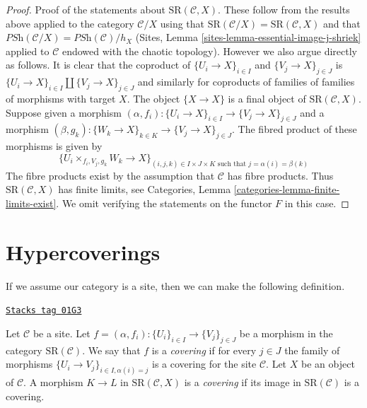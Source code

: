 \begin{proof}
\medskip\noindent
Proof of the statements about $\text{SR}(\mathcal{C}, X)$.
These follow from the results above applied to the category
$\mathcal{C}/X$ using that
$\text{SR}(\mathcal{C}/X) = \text{SR}(\mathcal{C}, X)$ and that
$\textit{PSh}(\mathcal{C}/X) = \textit{PSh}(\mathcal{C})/h_X$
(Sites, Lemma \ref{sites-lemma-essential-image-j-shriek} applied
to $\mathcal{C}$ endowed with the chaotic topology). However
we also argue directly as follows.
It is clear that the coproduct of
$\{U_i \to X\}_{i \in I}$ and $\{V_j \to X\}_{j \in J}$
is $\{U_i \to X\}_{i \in I} \amalg \{V_j \to X\}_{j \in J}$
and similarly for coproducts of
families of families of morphisms with target $X$.
The object $\{X \to X\}$ is a final
object of $\text{SR}(\mathcal{C}, X)$.
Suppose given a morphism
$(\alpha, f_i) : \{U_i \to X\}_{i \in I} \to \{V_j \to X\}_{j \in J}$
and a morphism
$(\beta, g_k) : \{W_k \to X\}_{k \in K} \to \{V_j \to X\}_{j \in J}$.
The fibred product of these morphisms is given by
$$
\{ U_i \times_{f_i, V_j, g_k} W_k \to X \}_{(i, j, k) \in I \times J \times K
\text{ such that } j = \alpha(i) = \beta(k)}
$$
The fibre products exist by the assumption that
$\mathcal{C}$ has fibre products.
Thus $\text{SR}(\mathcal{C}, X)$ has finite limits,
see Categories, Lemma \ref{categories-lemma-finite-limits-exist}.
We omit verifying the statements on the functor $F$ in this case.
\end{proof}

\section{Hypercoverings}
\label{hypercovering-section-hypercoverings}
If we assume our category is a site, then we can make the following
definition.

\begin{definition}[Covering SR]
\label{hypercovering-definition-covering-SR}
\href{https://stacks.math.columbia.edu/tag/01G3}{\texttt{Stacks tag 01G3}}

Let $\mathcal{C}$ be a site. Let
$f = (\alpha, f_i) : \{U_i\}_{i \in I} \to \{V_j\}_{j \in J}$
be a morphism in the category $\text{SR}(\mathcal{C})$.
We say that $f$ is a {\it covering} if for every $j \in J$ the
family of morphisms $\{U_i \to V_j\}_{i \in I, \alpha(i) = j}$
is a covering for the site $\mathcal{C}$.
Let $X$ be an object of $\mathcal{C}$.
A morphism $K \to L$ in $\text{SR}(\mathcal{C}, X)$ is
a {\it covering} if its image in $\text{SR}(\mathcal{C})$ is
a covering.
\end{definition}

